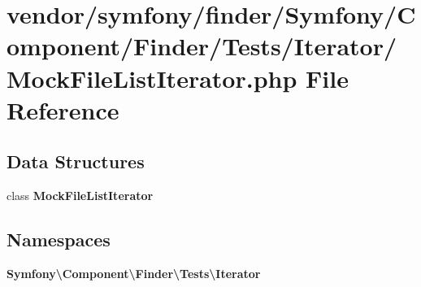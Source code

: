 \section{vendor/symfony/finder/\+Symfony/\+Component/\+Finder/\+Tests/\+Iterator/\+Mock\+File\+List\+Iterator.php File Reference}
\label{_mock_file_list_iterator_8php}
\subsection*{Data Structures}
\begin{DoxyCompactItemize}
\item 
class {\bf Mock\+File\+List\+Iterator}
\end{DoxyCompactItemize}
\subsection*{Namespaces}
\begin{DoxyCompactItemize}
\item 
 {\bf Symfony\textbackslash{}\+Component\textbackslash{}\+Finder\textbackslash{}\+Tests\textbackslash{}\+Iterator}
\end{DoxyCompactItemize}
